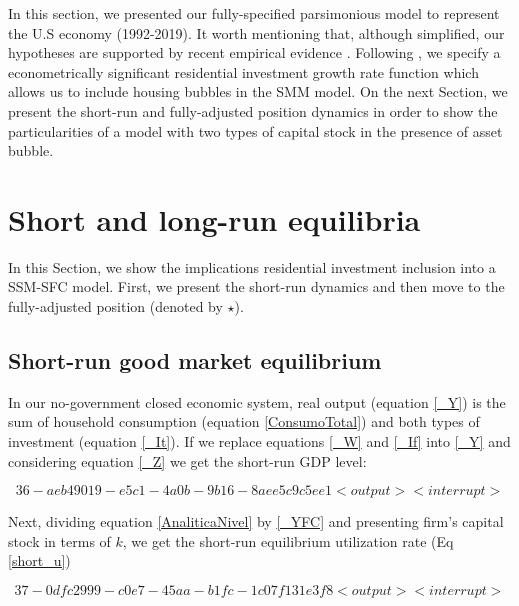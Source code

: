 \documentclass[11pt]{article}
\begin{document}
In this section, we presented our fully-specified parsimonious model to represent the U.S economy (1992-2019). It worth mentioning that, although simplified, our hypotheses are supported by recent empirical evidence \cites{albanesi_credit_2017}. Following \textcites{teixeira_crescimento_2015}{petrini_demanda_2019}, we specify a econometrically significant residential investment growth rate function which allows us to include housing bubbles in the SMM model. On the next Section, we present the short-run and fully-adjusted position dynamics in order to show the particularities of a model with two types of capital stock in the presence of asset bubble.




\section{Short and long-run equilibria}
\label{sec:org34bdbb7}
\label{sec:runs}

In this Section, we show the implications residential investment inclusion into a SSM-SFC model. First, we present the short-run dynamics and then move to the fully-adjusted position (denoted by \(\star\)).

\subsection{Short-run good market equilibrium}
\label{sec:org057dc09}
\label{short}

In our no-government closed economic system, real output (equation \ref{_Y}) is the sum of household consumption (equation \ref{ConsumoTotal}) and both types of investment (equation \ref{_It}). 
If we replace equations \ref{_W} and  \ref{_If} into \ref{_Y} and considering equation \ref{_Z} we get the short-run GDP level:



\begin{equation}
\label{AnaliticaNivel}
36 - aeb49019-e5c1-4a0b-9b16-8aee5c9c5ee1 <output> <interrupt>
\end{equation}

Next, dividing equation \ref{AnaliticaNivel} by \ref{_YFC} and presenting firm's capital stock in terms of \(k\), we get the short-run equilibrium utilization rate (Eq \ref{short_u})


\begin{equation}
\label{short_u}
37 - 0dfc2999-c0e7-45aa-b1fc-1c07f131e3f8 <output> <interrupt>
\end{equation}
\end{document}
